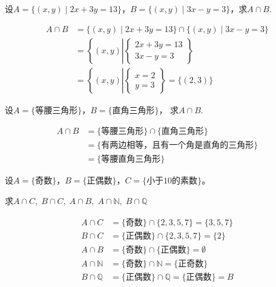 \begin{example}
设$A=\{(x,y)\mid 2x+3y=13\}$，$B=\{(x,y)\mid 3x-y=3\}$，求$A\cap B$.
\end{example}

\begin{solution}
    \[\begin{aligned}
A\cap B&=\{(x,y)\mid 2x+3y=13\}\cap \{(x,y)\mid 3x-y=3\}\\
&=\left\{(x,y)\left|\begin{cases}
    2x+3y=13\\  3x-y=3
\end{cases}\right.\right\}\\
&=\left\{(x,y)\left|\begin{cases}
    x=2\\y=3
\end{cases}\right.\right\}=\{(2,3)\}
    \end{aligned}\]
\end{solution}

\begin{example}
    设$A=\{\text{等腰三角形}\}$，$B=\{\text{直角三角形}\}$，
求$A\cap B$.
\end{example}

\begin{solution}
\[\begin{aligned}
    A\cap B&=\{\text{等腰三角形}\}\cap\{\text{直角三角形}\}\\
    &=\{\text{有两边相等，且有一个角是直角的三角形}\}\\
    &=\{\text{等腰直角三角形}\}
\end{aligned}\]
\end{solution}

\begin{example}
    设$A=\{\text{奇数}\}$，$B=\{\text{正偶数}\}$，$C=\{
\text{小于10的素数}\}$。

求$A\cap C,\; B\cap C,\; A\cap B,\; A\cap \mathbb{N},\; B\cap\mathbb{Q}$
\end{example}

\begin{solution}
\[\begin{aligned}
    A\cap C&=\{\text{奇数}\}\cap\{2,3,5,7\}=\{3,5,7\} \\
     B\cap C&= \{\text{正偶数}\}\cap \{2,3,5,7\}=\{2\}\\
      A\cap B&=\{\text{奇数}\}\cap\{\text{正偶数}\}=\emptyset \\
       A\cap \mathbb{N}&=\{\text{奇数}\}\cap\mathbb{N}=\{\text{正奇数}\} \\
        B\cap\mathbb{Q}&= \{\text{正偶数}\}\cap\mathbb{Q}=\{\text{正偶数}\}=B
\end{aligned}\]
\end{solution}


